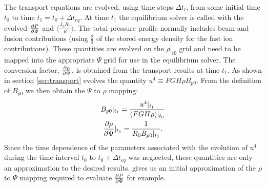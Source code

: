 The transport equations are evolved, using time steps $\Delta t_t$, from some
initial time $t_0$ to time $t_1 =  t_0 +\Delta t_{eq} $. At time $t_1$ the
equilibrium solver is called with the evolved $\frac{\partial{ P}}{\partial{ \Psi}} $ and
$\langle\frac{J_{\phi}R_0}{R}\rangle$. The total pressure profile normally
includes beam and fusion contributions (using $\frac{2}{3}$ of the stored energy
density for the fast ion contributions). These quantities are evolved on the
$\rho\vert_{t0} $ grid and need to be mapped into the appropriate $\Psi $ grid
for use in the equilibrium solver. The conversion factor, $\frac{\partial{ \rho}}{\partial{ \Psi}}$,
is obtained from the transport results at time $t_1$. As shown in section
\ref{sec:transport} \ot evolves the quantity $u^4 \equiv FGH  \rho B_{p0} $.
From the definition of $B_{p0}$ we then obtain the $\Psi$ to $ \rho $ mapping:
\begin{subequations}\label{mhd:k}
 \begin{gather}
  B_{p0}\vert_{t_1} = \frac{u^4\vert_{t_1}}{(FGH\rho)\vert_{t_0}} \\
  \frac{\partial{ \rho}}{\partial{ \Psi}}\vert_{t_1} = \frac{1}{R_0 B_{p0}\vert_{t_1}}.
   \label{mhd:k1}
 \end{gather}
\end{subequations}  
Since the time dependence of the parameters associated with the
evolution of $ u^4 $ during the time interval $ t_0 $ to $ t_0 + \Delta
t_{eq} $ was neglected, these quantities are only an approximation to
the desired results.  gives us an initial
approximation of the $\rho$ to $\Psi $ mapping required to evaluate
$\frac{\partial{ P}}{\partial{ \Psi}}$ for example. 

